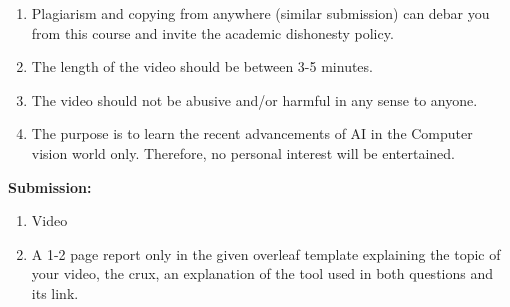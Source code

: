 \documentclass[12pt, a4paper]{exam}
\begin{document}
\noindent
\centering
{\small \bfseries \begin{enumerate}
\item Plagiarism and copying from anywhere (similar submission) can debar you from this course and invite the academic dishonesty policy.
    \item The length of the video should be between 3-5 minutes.
    \item The video should not be abusive and/or harmful in any sense to anyone.
    \item The purpose is to learn the recent advancements of AI in the Computer vision world only. Therefore, no personal interest will be entertained. \\
 \end{enumerate}   
    
   \textbf{Submission:}\\
  \begin{enumerate}
    \item Video
    \item A 1-2 page report only in the given overleaf template explaining the topic of your video, the crux, an explanation of the tool used in both questions and its link.
    
\end{enumerate}}
\vspace{0.2in}
\end{document}
